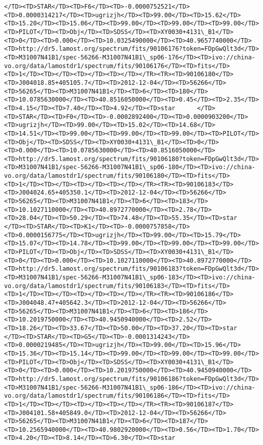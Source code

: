 \documentclass[11pt]{article}
\begin{document}
\begin{Verbatim}[commandchars=\\\{\}]
     </TD><TD>STAR</TD><TD>F6</TD><TD>-0.0000752521</TD><TD>0.0000314217</TD><TD>ugrizjh</TD><TD>99.00</TD><TD>15.62</TD><TD>15.20</TD><TD>15.06</TD><TD>99.00</TD><TD>99.00</TD><TD>99.00</TD><TD>PILOT</TD><TD>Obj</TD><TD>SDSS</TD><TD>XY0030+4131\_B1</TD><TD>0</TD><TD>0.000</TD><TD>10.0325490000</TD><TD>40.9657740000</TD><TD>http://dr5.lamost.org/spectrum/fits/90106176?token=FDpGwQlt3d</TD><TD>M31007N41B1/spec-56266-M31007N41B1\_sp06-176</TD><TD>ivo://china-vo.org/data/lamostdr1/spectrum/fits/90106176</TD><TD>fits</TD><TD>1</TD><TD></TD><TD></TD><TD></TD></TR><TR><TD>90106180</TD><TD>J004018.85+405105.7</TD><TD>2012-12-04</TD><TD>56266</TD><TD>56265</TD><TD>M31007N41B1</TD><TD>6</TD><TD>180</TD><TD>10.0785630000</TD><TD>40.8516050000</TD><TD>0.45</TD><TD>2.35</TD><TD>4.15</TD><TD>7.40</TD><TD>4.92</TD><TD>star      </TD><TD>STAR</TD><TD>F0</TD><TD>-0.0002892400</TD><TD>0.0000903200</TD><TD>ugrizjh</TD><TD>99.00</TD><TD>15.02</TD><TD>14.68</TD><TD>14.51</TD><TD>99.00</TD><TD>99.00</TD><TD>99.00</TD><TD>PILOT</TD><TD>Obj</TD><TD>SDSS</TD><TD>XY0030+4131\_B1</TD><TD>0</TD><TD>0.000</TD><TD>10.0785630000</TD><TD>40.8516050000</TD><TD>http://dr5.lamost.org/spectrum/fits/90106180?token=FDpGwQlt3d</TD><TD>M31007N41B1/spec-56266-M31007N41B1\_sp06-180</TD><TD>ivo://china-vo.org/data/lamostdr1/spectrum/fits/90106180</TD><TD>fits</TD><TD>1</TD><TD></TD><TD></TD><TD></TD></TR><TR><TD>90106183</TD><TD>J004024.65+405350.1</TD><TD>2012-12-04</TD><TD>56266</TD><TD>56265</TD><TD>M31007N41B1</TD><TD>6</TD><TD>183</TD><TD>10.1027110000</TD><TD>40.8972770000</TD><TD>2.78</TD><TD>28.04</TD><TD>50.29</TD><TD>74.48</TD><TD>55.35</TD><TD>star      </TD><TD>STAR</TD><TD>K1</TD><TD>-0.0000757858</TD><TD>0.0000156775</TD><TD>ugrizjh</TD><TD>99.00</TD><TD>15.79</TD><TD>15.07</TD><TD>14.78</TD><TD>99.00</TD><TD>99.00</TD><TD>99.00</TD><TD>PILOT</TD><TD>Obj</TD><TD>SDSS</TD><TD>XY0030+4131\_B1</TD><TD>0</TD><TD>0.000</TD><TD>10.1027110000</TD><TD>40.8972770000</TD><TD>http://dr5.lamost.org/spectrum/fits/90106183?token=FDpGwQlt3d</TD><TD>M31007N41B1/spec-56266-M31007N41B1\_sp06-183</TD><TD>ivo://china-vo.org/data/lamostdr1/spectrum/fits/90106183</TD><TD>fits</TD><TD>1</TD><TD></TD><TD></TD><TD></TD></TR><TR><TD>90106186</TD><TD>J004048.47+405642.3</TD><TD>2012-12-04</TD><TD>56266</TD><TD>56265</TD><TD>M31007N41B1</TD><TD>6</TD><TD>186</TD><TD>10.2019750000</TD><TD>40.9450940000</TD><TD>2.52</TD><TD>18.26</TD><TD>33.67</TD><TD>50.00</TD><TD>37.20</TD><TD>star      </TD><TD>STAR</TD><TD>G5</TD><TD>-0.0001314243</TD><TD>0.0000219485</TD><TD>ugrizjh</TD><TD>99.00</TD><TD>15.96</TD><TD>15.36</TD><TD>15.14</TD><TD>99.00</TD><TD>99.00</TD><TD>99.00</TD><TD>PILOT</TD><TD>Obj</TD><TD>SDSS</TD><TD>XY0030+4131\_B1</TD><TD>0</TD><TD>0.000</TD><TD>10.2019750000</TD><TD>40.9450940000</TD><TD>http://dr5.lamost.org/spectrum/fits/90106186?token=FDpGwQlt3d</TD><TD>M31007N41B1/spec-56266-M31007N41B1\_sp06-186</TD><TD>ivo://china-vo.org/data/lamostdr1/spectrum/fits/90106186</TD><TD>fits</TD><TD>1</TD><TD></TD><TD></TD><TD></TD></TR><TR><TD>90106187</TD><TD>J004101.58+405849.0</TD><TD>2012-12-04</TD><TD>56266</TD><TD>56265</TD><TD>M31007N41B1</TD><TD>6</TD><TD>187</TD><TD>10.2565940000</TD><TD>40.9802920000</TD><TD>0.56</TD><TD>1.70</TD><TD>4.20</TD><TD>8.14</TD><TD>6.30</TD><TD>star      
\end{Verbatim}
\end{document}
